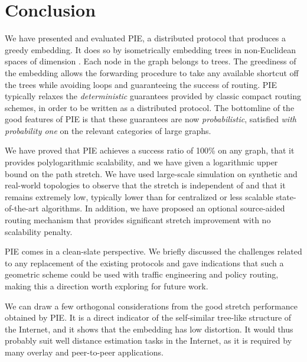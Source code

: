 \documentclass[conference]{IEEEtran}
\begin{document}
\section{Conclusion}
\label{sec:conclusion}


We have presented and evaluated PIE, a distributed protocol that produces a greedy embedding. It does so by isometrically embedding trees in non-Euclidean spaces of dimension . Each node in the graph belongs to  trees.
The greediness of the embedding allows the forwarding procedure to take any available shortcut off the trees while avoiding loops and guaranteeing the success of routing.
PIE typically relaxes the \emph{deterministic} guarantees provided by classic compact routing schemes, in order to be written as a distributed protocol. The bottomline of the good features of PIE is that these guarantees are now \emph{probabilistic}, satisfied \emph{with probability one} on the relevant categories of large graphs.


We have proved that PIE achieves a success ratio of 100\% on any graph, that it provides polylogarithmic scalability, and we have given a logarithmic upper bound on the path stretch. We have used large-scale simulation on synthetic and real-world topologies to observe that the stretch is independent of  and that it remains extremely low, typically lower than for centralized or less scalable state-of-the-art algorithms. In addition, we have proposed an optional source-aided routing mechanism that provides significant stretch improvement with no scalability penalty.



PIE comes in a clean-slate perspective. We briefly discussed the challenges related to any replacement of the existing protocols and gave indications that such a geometric scheme could be used with traffic engineering and policy routing, making this a direction worth exploring for future work.


We can draw a few orthogonal considerations from the good stretch performance obtained by PIE. It is 
a direct indicator of the self-similar tree-like structure of the Internet,
and it shows that the embedding has low distortion. It would thus probably suit well distance estimation tasks in the Internet, 
as it is required by many overlay and peer-to-peer applications.




\end{document}

